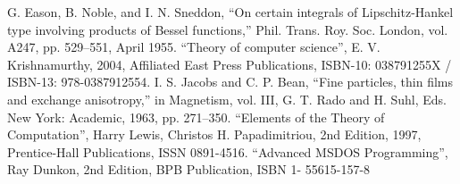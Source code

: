 \documentclass[conference]{IEEEtran}
\begin{document}
\begin{thebibliography}{00}
 G. Eason, B. Noble, and I. N. Sneddon, ``On certain integrals of Lipschitz-Hankel type involving products of Bessel functions,'' Phil. Trans. Roy. Soc. London, vol. A247, pp. 529--551, April 1955.
 “Theory of computer science”, E. V. Krishnamurthy, 2004, Affiliated East Press Publications, ISBN-10: 038791255X / ISBN-13: 978-0387912554. 
 I. S. Jacobs and C. P. Bean, ``Fine particles, thin films and exchange anisotropy,'' in Magnetism, vol. III, G. T. Rado and H. Suhl, Eds. New York: Academic, 1963, pp. 271--350.
 “Elements of the Theory of Computation”, Harry Lewis, Christos H. Papadimitriou, 2nd Edition, 1997, Prentice-Hall Publications, ISSN 0891-4516.
 “Advanced MSDOS Programming”, Ray Dunkon, 2nd Edition, BPB Publication, ISBN 1- 55615-157-8
\end{thebibliography}
\end{document}
